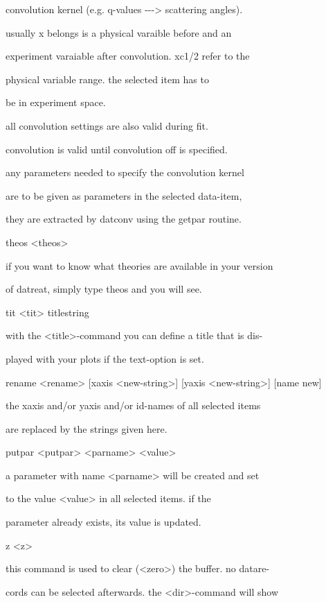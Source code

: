 \documentclass[]{article}
\begin{document}
convolution kernel (e.g. q-values -\/-\/-\textgreater{} scattering
angles).

usually x belongs is a physical varaible before and an

experiment varaiable after convolution. xc1/2 refer to the

physical variable range. the selected item has to

be in experiment space.

all convolution settings are also valid during fit.

convolution is valid until convolution off is specified.

any parameters needed to specify the convolution kernel

are to be given as parameters in the selected data-item,

they are extracted by datconv using the getpar routine.

theos \textless{}theos\textgreater{}

if you want to know what theories are available in your version

of datreat, simply type theos and you will see.

tit \textless{}tit\textgreater{} titlestring

with the \textless{}title\textgreater{}-command you can define a title
that is dis-

played with your plots if the text-option is set.

rename \textless{}rename\textgreater{} {[}xaxis
\textless{}new-string\textgreater{}{]} {[}yaxis
\textless{}new-string\textgreater{}{]} {[}name new{]}

the xaxis and/or yaxis and/or id-names of all selected items

are replaced by the strings given here.

putpar \textless{}putpar\textgreater{} \textless{}parname\textgreater{}
\textless{}value\textgreater{}

a parameter with name \textless{}parname\textgreater{} will be created
and set

to the value \textless{}value\textgreater{} in all selected items. if
the

parameter already exists, its value is updated.

z \textless{}z\textgreater{}

this command is used to clear (\textless{}zero\textgreater{}) the
buffer. no datare-

cords can be selected afterwards. the
\textless{}dir\textgreater{}-command will show
\end{document}

